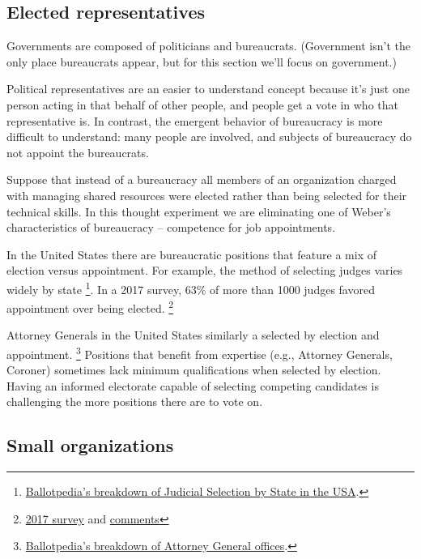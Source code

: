 \subsection{Elected representatives}
Governments are composed of politicians and bureaucrats. (Government isn't the only place bureaucrats appear, but for this section we'll focus on government.)

Political representatives are an easier to understand concept because it's just one person acting in that behalf of other people, and people get a vote in who that representative is.
In contrast, the emergent behavior of bureaucracy is more difficult to understand: many people are involved, and subjects of bureaucracy do not appoint the bureaucrats. 

Suppose that instead of a bureaucracy all members of an organization charged with managing shared resources were elected rather than being selected for their technical skills. In this thought experiment we are eliminating one of Weber's characteristics of bureaucracy -- competence for job appointments. 

In the United States there are bureaucratic positions that feature a mix of election versus appointment. For example, the method of selecting judges varies widely by state \footnote{\href{https://ballotpedia.org/Judicial_selection_in_the_states}{Ballotpedia's breakdown of Judicial Selection by State in the USA}.}. In a 2017 survey, 63\% of more than 1000 judges favored appointment over being elected. \footnote{\href{https://www.judges.org/news-and-info/the-age-old-question-should-judges-be-appointed-or-elected-heres-what-you-said/}{2017 survey} and \href{https://www.judges.org/wp-content/uploads/2020/03/Q1_Text.pdf}{comments}}

Attorney Generals in the United States similarly a selected by election and appointment.
\footnote{\href{https://ballotpedia.org/Attorney_General_office_comparison}{Ballotpedia's breakdown of Attorney General offices}.} Positions that benefit from expertise (e.g., Attorney Generals, Coroner) sometimes lack minimum qualifications when selected by election. Having an informed electorate capable of selecting competing candidates is challenging the more positions there are to vote on.

\subsection{Small organizations}

